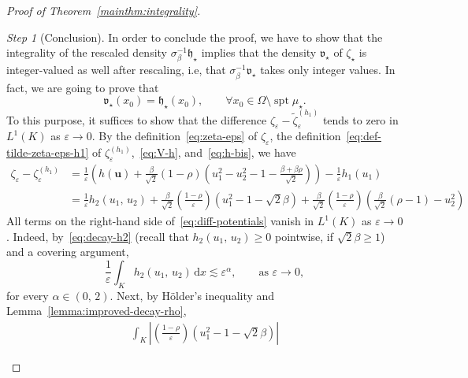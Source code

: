 \documentclass[a4paper, 11pt, twoside, leqno]{article}
\theoremstyle{definition}              %
\theoremstyle{remark}                  %
\newtheorem{step}{Step}
\DeclareMathOperator{\spt}{spt}                                     %
\newcommand{\abs}[1]{\left| #1 \right|}                             %
\newcommand{\csubset}{\subset\!\subset}                             %
\renewcommand{\d}{\mathrm{d}}
\renewcommand{\u}{\mathbf{u}}
\newcommand{\eps}{\varepsilon}
\begin{document}
\begin{proof}[{Proof of Theorem~\ref{mainthm:integrality}}]
	\begin{step}[Conclusion]
	In order to conclude the proof, we have to show that the 
	integrality of the rescaled density $\sigma_\beta^{-1} \mathfrak{h}_\star$  
	implies that the density $\mathfrak{v}_\star$ of $\zeta_\star$ 
	is integer-valued as well after rescaling, i.e, that 
	$\sigma_\beta^{-1} \mathfrak{v}_\star$ takes only integer values. 
	In fact, we are going to prove that 
	\begin{equation}\label{eq:v*=h*}
		\mathfrak{v}_\star(x_0) = \mathfrak{h}_\star(x_0), 
		\qquad \forall x_0 \in \Omega \setminus \spt\mu_\star.
	\end{equation}
	To this purpose, it suffices to 
	show that the difference $\zeta_\eps - \widetilde{\zeta}^{(h_1)}_\eps$ 
	tends to zero in $L^1\left(K\right)$ as $\eps \to 0$.
	By the definition~\eqref{eq:zeta-eps} of $\zeta_\eps$, the 
	definition~\eqref{eq:def-tilde-zeta-eps-h1} of 
	${\zeta}^{(h_1)}_\eps$,~\eqref{eq:V-h}, and~\eqref{eq:h-bis}, we have 
	\begin{equation}\label{eq:diff-potentials}
	\begin{split}
		\zeta_\eps - \zeta^{(h_1)}_\eps 
		&= \frac{1}{\eps}\left( h(\u) + \frac{\beta}{\sqrt{2}} (1-\rho)\left(u_1^2 - u_2^2 - 1 - \frac{\beta + \beta \rho}{\sqrt{2}} \right) \right) 
		- \frac{1}{\eps}h_1(u_{1}) \\
		&= \frac{1}{\eps} h_2(u_1,\,u_2) + \frac{\beta}{\sqrt{2}} \left(\frac{1-\rho}{\eps}\right)\left(u_1^2 - 1 - \sqrt{2}\beta\right) + \frac{\beta}{\sqrt{2}}\left( \frac{1-\rho}{\eps} \right) \left( \frac{\beta}{\sqrt{2}}(\rho - 1) - u_2^2 \right)
	\end{split}
	\end{equation}
	All terms on the right-hand side of~\eqref{eq:diff-potentials} 
	vanish in $L^1\left( K \right)$ as $\eps \to 0$. 
	Indeed, by~\eqref{eq:decay-h2} (recall that $h_2(u_1,\,u_2) \geq 0$ pointwise, 
	if $\sqrt{2}\beta \geq 1$) and a covering argument, 
	\[
		\frac{1}{\eps} \int_K h_2(u_1,\,u_2) \,{\d}x \lesssim \eps^\alpha, 
		\qquad \mbox{as } \eps \to 0, 
	\]
	for every $\alpha \in (0,\,2)$. Next, by H\"{o}lder's inequality 
	and Lemma~\ref{lemma:improved-decay-rho}, 
	\[
	\begin{split}
		\int_K \abs{\left(\frac{1-\rho}{\eps}\right)\left(u_1^2 - 1 - \sqrt{2}\beta\right)} 

\end{split}\]
\end{step}
\end{proof}
\end{document}

